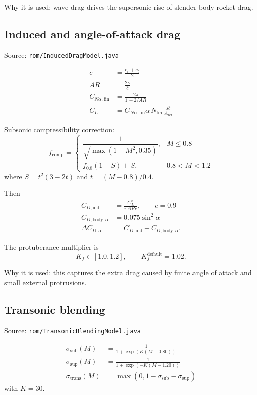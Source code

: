 \documentclass[11pt]{article}
\begin{document}
Why it is used: wave drag drives the supersonic rise of slender-body rocket drag.

\subsection{Induced and angle-of-attack drag}
Source: \texttt{rom/InducedDragModel.java}

\begin{align*}
\bar c &= \frac{c_r+c_t}{2} \\
AR &= \frac{2s}{\bar c} \\
C_{N\alpha,\mathrm{fin}} &= \frac{2\pi}{1+2/AR} \\
C_L &= C_{N\alpha,\mathrm{fin}}\alpha\,N_{\mathrm{fin}}\,\frac{s\bar c}{A_{\mathrm{ref}}}
\end{align*}

Subsonic compressibility correction:
\begin{equation*}
f_{\mathrm{comp}}=
\begin{cases}
\dfrac{1}{\sqrt{\max(1-M^2,0.35)}}, & M \le 0.8 \\
f_{0.8}(1-S) + S, & 0.8 < M < 1.2
\end{cases}
\end{equation*}
where $S=t^2(3-2t)$ and $t=(M-0.8)/0.4$.

Then
\begin{align*}
C_{D,\mathrm{ind}} &= \frac{C_L^2}{\pi ARe}, \qquad e=0.9 \\
C_{D,\mathrm{body},\alpha} &= 0.075\sin^2\alpha \\
\Delta C_{D,\alpha} &= C_{D,\mathrm{ind}} + C_{D,\mathrm{body},\alpha}.
\end{align*}

The protuberance multiplier is
\begin{equation*}
K_f \in [1.0,1.2], \qquad K_f^{\mathrm{default}} = 1.02.
\end{equation*}

Why it is used: this captures the extra drag caused by finite angle of attack and small external protrusions.

\subsection{Transonic blending}
Source: \texttt{rom/TransonicBlendingModel.java}

\begin{align*}
\sigma_{\mathrm{sub}}(M) &= \frac{1}{1+\exp(K(M-0.80))} \\
\sigma_{\mathrm{sup}}(M) &= \frac{1}{1+\exp(-K(M-1.20))} \\
\sigma_{\mathrm{trans}}(M) &= \max\!\left(0,1-\sigma_{\mathrm{sub}}-\sigma_{\mathrm{sup}}\right)
\end{align*}
with $K=30$.
\end{document}
